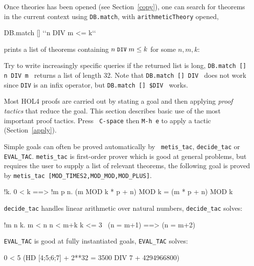 \documentclass[a4paper,10pt]{article}
\begin{document}
Once theories has been opened (see Section~\ref{copy}), one can search for theorems in the current
context using {\tt DB.match}, \eg{} with {\tt arithmeticTheory} opened,
\begin{code}
DB.match [] {`}`n DIV m <= k{`}`
\end{code}
prints a list of theorems containing $n\; \texttt{\small DIV} \;m \leq k$ for some $n,m,k$:
\begin{code}
[(("arithmetic", "DIV_LE_MONOTONE"),
  (|- !n x y. 0 < n \conj{} x <= y ==> x DIV n <= y DIV n, Thm)),
 (("arithmetic", "DIV_LE_X"),
  (|- !x y z. 0 < z ==> (y DIV z <= x = y < (x + 1) * z), Thm)),
 (("arithmetic", "DIV_LESS_EQ"),
  (|- !n. 0 < n ==> !k. k DIV n <= k, Thm))]
\end{code}
Try to write increasingly specific queries if the returned list is long, \eg{}
{\tt\small DB.match [] \sq \sq n DIV m \sq \sq} returns a list of length 32. Note that {\tt\small DB.match [] \sq \sq DIV \sq \sq}
does not work since {\tt\small DIV} is an infix operator, but {\tt\small DB.match [] \sq \sq \$DIV \sq \sq} works.


Most HOL4 proofs are carried out by stating a goal and then applying
\emph{proof tactics} that reduce the goal.  This section describes
basic use of the most important proof tactics.  Press {\tt\small
  C-space} then {\tt\small M-h e} to apply a tactic
(Section~\ref{apply}).



Simple goals can often be proved automatically by {\tt\small
  metis\_tac}, {\tt\small decide\_tac} or {\tt\small EVAL\_TAC}.
{\tt\small metis\_tac} is first-order prover which is good at general
problems, but requires the user to supply a list of relevant theorems,
\eg{} the following goal is proved by {\tt\small metis\_tac
  [MOD\_TIMES2,MOD\_MOD,MOD\_PLUS]}.
\begin{code}
!k. 0 < k ==> !m p n. (m MOD k * p + n) MOD k = (m * p + n) MOD k
\end{code}

\noindent
{\tt\small decide\_tac} handles linear arithmetic over natural
numbers, \eg{} {\tt\small decide\_tac} solves:
\begin{code}
!m n k. m < n \conj{} n < m+k \conj{} k <= 3 \conj{} ~(n = m+1) ==> (n = m+2)
\end{code}
{\tt\small EVAL\_TAC} is good at fully instantiated goals, \eg{} {\tt\small EVAL\_TAC} solves:
\begin{code}
0 < 5 \conj{} (HD [4;5;6;7] + 2**32 = 3500 DIV 7 + 4294966800)
\end{code}
\end{document}
